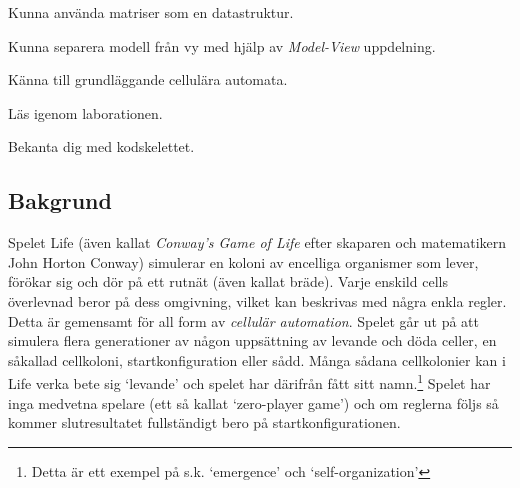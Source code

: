 


\Lab{\LabWeekTWELVE}

\begin{Goals}
    \item Kunna använda matriser som en datastruktur.
    \item Kunna separera modell från vy med hjälp av \emph{Model-View} uppdelning.
    \item Känna till grundläggande cellulära automata. %
\end{Goals}

\begin{Preparations}
    \item Läs igenom laborationen.
    \item Bekanta dig med kodskelettet.
\end{Preparations}

\subsection{Bakgrund}

Spelet Life (även kallat \emph{Conway's Game of Life} efter skaparen och matematikern John Horton Conway) simulerar en koloni av encelliga organismer som lever, förökar sig och dör på ett rutnät (även kallat bräde). Varje enskild cells överlevnad beror på dess omgivning, vilket kan beskrivas med några enkla regler. Detta är gemensamt för all form av \emph{cellulär automation}. Spelet går ut på att simulera flera generationer av någon uppsättning av levande och döda celler, en såkallad cellkoloni, startkonfiguration eller sådd. Många sådana cellkolonier kan i Life verka bete sig `levande' och spelet har därifrån fått sitt namn.\footnote{Detta är ett exempel på s.k. `emergence' och `self-organization'} Spelet har inga medvetna spelare (ett så kallat `zero-player game') och om reglerna följs så kommer slutresultatet fullständigt bero på startkonfigurationen.

